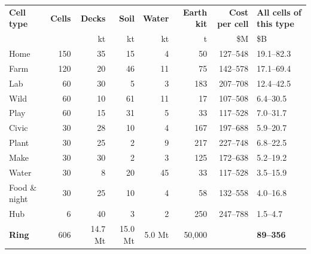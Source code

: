 \begin{tabularx}{\textwidth}{@{}lrrrrrrX@{}}
\toprule
\textbf{Cell type} & \textbf{Cells} & \textbf{Decks} & \textbf{Soil} & \textbf{Water} & \textbf{Earth kit} & \textbf{Cost per cell} & \textbf{All cells of this type}\\
 & & kt & kt & kt & t & \$M & \$B\\
\midrule
Home & 150 & 35 & 15 & 4 & 50 & 127--548 & 19.1--82.3\\
Farm & 120 & 20 & 46 & 11 & 75 & 142--578 & 17.1--69.4\\
Lab & 60 & 30 & 5 & 3 & 183 & 207--708 & 12.4--42.5\\
Wild & 60 & 10 & 61 & 11 & 17 & 107--508 & 6.4--30.5\\
Play & 60 & 15 & 31 & 5 & 33 & 117--528 & 7.0--31.7\\
Civic & 30 & 28 & 10 & 4 & 167 & 197--688 & 5.9--20.7\\
Plant & 30 & 25 & 2 & 9 & 217 & 227--748 & 6.8--22.5\\
Make & 30 & 30 & 2 & 3 & 125 & 172--638 & 5.2--19.2\\
Water & 30 & 8 & 20 & 45 & 33 & 117--528 & 3.5--15.9\\
Food \& night & 30 & 25 & 10 & 4 & 58 & 132--558 & 4.0--16.8\\
Hub & 6 & 40 & 3 & 2 & 250 & 247--788 & 1.5--4.7\\
\midrule
\textbf{Ring} & 606 & 14.7 Mt & 15.0 Mt & 5.0 Mt & 50,000 & & \textbf{89--356}\\
\bottomrule
\end{tabularx}